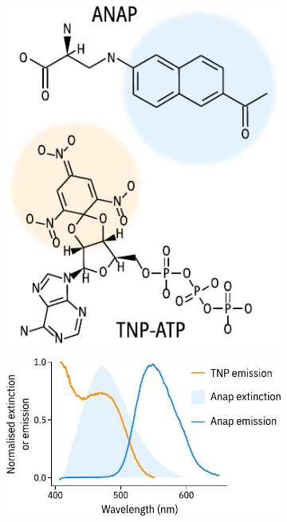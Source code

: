 \begin{figure}[h]
	\centering
	\begin{subfigure}[t]{0.4\textwidth}
		\caption{}\label{ch3fig:chemical_structures}
		\centering
		\includegraphics[width=\textwidth]{chemical_structures.pdf}
	\end{subfigure}
	\hfill
	\parbox[t]{0.5\textwidth}{
	\begin{subfigure}[t]{0.5\textwidth}
		\caption{}\label{ch3fig:spectral_overlap}
		\centering
		\includegraphics[width=\textwidth]{spectral_overlap.pdf}

\end{subfigure}}
\end{figure}
